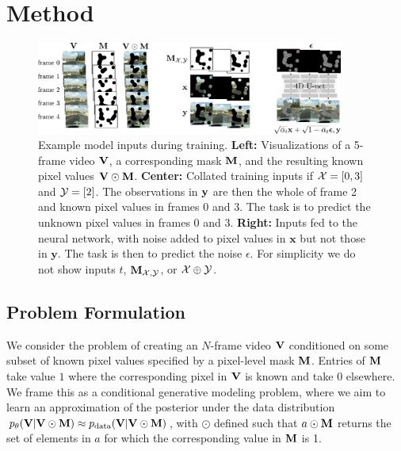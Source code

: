 \chapter{Method}
\label{sec:VICDM}

\begin{figure}[t]
    \centering
        \includegraphics[width=0.9\textwidth]{figures/architecture-overview/video-inpainting-overview.pdf}
    \caption[Example model inputs during training.]{Example model inputs during training. \textbf{Left:} Visualizations of a 5-frame video $\mathbf{V}$, a corresponding mask $\mathbf{M}$, and the resulting known pixel values $\mathbf{V}\odot\mathbf{M}$. \textbf{Center:} Collated training inputs if $\mathcal{X} = [0, 3]$ and $\mathcal{Y} = [2]$. The observations in $\mathbf{y}$ are then the whole of frame 2 and known pixel values in frames 0 and 3. The task is to predict the unknown pixel values in frames 0 and 3. \textbf{Right:} Inputs fed to the neural network, with noise added to pixel values in $\mathbf{x}$ but not those in $\mathbf{y}$. The task is then to predict the noise $\epsilon$. For simplicity we do not show inputs $t$, $\mathbf{M}_{\mathcal{X},\mathcal{Y}}$, or $\mathcal{X}\oplus\mathcal{Y}$.}
    \label{fig:arch-and-training}
\end{figure}

\section{Problem Formulation}
We consider the problem of creating an $N$-frame video $\mathbf{V}$ conditioned on some subset of known pixel values specified by a pixel-level mask $\mathbf{M}$. Entries of $\mathbf{M}$ take value $1$ where the corresponding pixel in $\mathbf{V}$ is known and take $0$ elsewhere. We frame this as a conditional generative modeling problem, where we aim to learn an approximation of the posterior under the data distribution $p_\theta(\mathbf{V}|\mathbf{V} \odot \mathbf{M}) \approx p_\text{data}(\mathbf{V}|\mathbf{V} \odot \mathbf{M})$, with $\odot$ defined such that $a \odot \mathbf{M}$ returns the set of elements in $a$ for which the corresponding value in $\mathbf{M}$ is 1.


